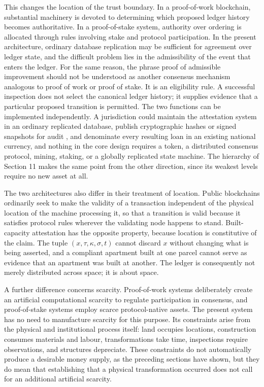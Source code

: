 \documentclass[11pt]{article}
\theoremstyle{definition}
\begin{document}
This changes the location of the trust boundary. In a proof-of-work blockchain, substantial machinery is devoted to determining which proposed ledger history becomes authoritative. In a proof-of-stake system, authority over ordering is allocated through rules involving stake and protocol participation. In the present architecture, ordinary database replication may be sufficient for agreement over ledger state, and the difficult problem lies in the admissibility of the event that enters the ledger. For the same reason, the phrase proof of admissible improvement should not be understood as another consensus mechanism analogous to proof of work or proof of stake. It is an eligibility rule. A successful inspection does not select the canonical ledger history; it supplies evidence that a particular proposed transition is permitted. The two functions can be implemented independently. A jurisdiction could maintain the attestation system in an ordinary replicated database, publish cryptographic hashes or signed snapshots for audit \cite{merkle1987, laurie2013}, and denominate every resulting loan in an existing national currency, and nothing in the core design requires a token, a distributed consensus protocol, mining, staking, or a globally replicated state machine. The hierarchy of Section 11 makes the same point from the other direction, since its weakest levels require no new asset at all.

The two architectures also differ in their treatment of location. Public blockchains ordinarily seek to make the validity of a transaction independent of the physical location of the machine processing it, so that a transition is valid because it satisfies protocol rules wherever the validating node happens to stand. Built-capacity attestation has the opposite property, because location is constitutive of the claim. The tuple $(x,\tau,\kappa,\sigma,t)$ cannot discard $x$ without changing what is being asserted, and a compliant apartment built at one parcel cannot serve as evidence that an apartment was built at another. The ledger is consequently not merely distributed across space; it is about space.

A further difference concerns scarcity. Proof-of-work systems deliberately create an artificial computational scarcity to regulate participation in consensus, and proof-of-stake systems employ scarce protocol-native assets. The present system has no need to manufacture scarcity for this purpose. Its constraints arise from the physical and institutional process itself: land occupies locations, construction consumes materials and labour, transformations take time, inspections require observations, and structures depreciate. These constraints do not automatically produce a desirable money supply, as the preceding sections have shown, but they do mean that establishing that a physical transformation occurred does not call for an additional artificial scarcity.
\end{document}
